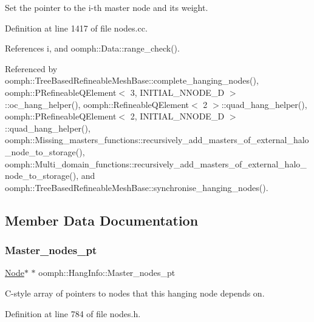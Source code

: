 Set the pointer to the i-\/th master node and its weight. 



Definition at line 1417 of file nodes.\+cc.



References i, and oomph\+::\+Data\+::range\+\_\+check().



Referenced by oomph\+::\+Tree\+Based\+Refineable\+Mesh\+Base\+::complete\+\_\+hanging\+\_\+nodes(), oomph\+::\+P\+Refineable\+Q\+Element$<$ 3, I\+N\+I\+T\+I\+A\+L\+\_\+\+N\+N\+O\+D\+E\+\_\+D $>$\+::oc\+\_\+hang\+\_\+helper(), oomph\+::\+Refineable\+Q\+Element$<$ 2 $>$\+::quad\+\_\+hang\+\_\+helper(), oomph\+::\+P\+Refineable\+Q\+Element$<$ 2, I\+N\+I\+T\+I\+A\+L\+\_\+\+N\+N\+O\+D\+E\+\_\+D $>$\+::quad\+\_\+hang\+\_\+helper(), oomph\+::\+Missing\+\_\+masters\+\_\+functions\+::recursively\+\_\+add\+\_\+masters\+\_\+of\+\_\+external\+\_\+halo\+\_\+node\+\_\+to\+\_\+storage(), oomph\+::\+Multi\+\_\+domain\+\_\+functions\+::recursively\+\_\+add\+\_\+masters\+\_\+of\+\_\+external\+\_\+halo\+\_\+node\+\_\+to\+\_\+storage(), and oomph\+::\+Tree\+Based\+Refineable\+Mesh\+Base\+::synchronise\+\_\+hanging\+\_\+nodes().



\subsection{Member Data Documentation}
\mbox{\label{classoomph_1_1HangInfo_aa2bceeaff9247520fdd786f612237a18}} 
\subsubsection{\texorpdfstring{Master\+\_\+nodes\+\_\+pt}{Master\_nodes\_pt}}
{\footnotesize\ttfamily \hyperlink{classoomph_1_1Node}{Node}$\ast$ $\ast$ oomph\+::\+Hang\+Info\+::\+Master\+\_\+nodes\+\_\+pt\hspace{0.3cm}{\ttfamily [private]}}



C-\/style array of pointers to nodes that this hanging node depends on. 



Definition at line 784 of file nodes.\+h.

